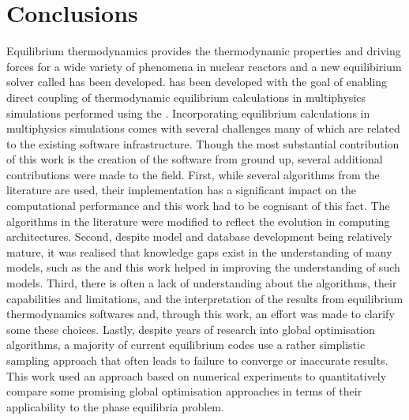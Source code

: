 \chapter{Conclusions} \label{chap:conclusions}

	Equilibrium thermodynamics provides the thermodynamic properties and driving forces for a wide variety of phenomena in nuclear reactors and a new equilibirium solver called {\GEM} has been developed. {\GEM} has been developed with the goal of enabling direct coupling of thermodynamic equilibrium calculations in multiphysics simulations performed using the . Incorporating equilibrium calculations in multiphysics simulations comes with several challenges many of which are related to the existing software infrastructure. Though the most substantial contribution of this work is the creation of the software from ground up, several additional contributions were made to the field. First, while several algorithms from the literature are used, their implementation has a significant impact on the computational performance and this work had to be cognisant of this fact. The algorithms in the literature were modified to reflect the evolution in computing architectures. Second, despite model and database development being relatively mature, it was realised that knowledge gaps exist in the understanding of many models, such as the  and this work helped in improving the understanding of such models. Third, there is often a lack of understanding about the algorithms, their capabilities and limitations, and the interpretation of the results from equilibrium thermodynamics softwares and, through this work, an effort was made to clarify some these choices. Lastly, despite years of research into global optimisation algorithms, a majority of current equilibrium codes use a rather simplistic sampling approach that often leads to failure to converge or inaccurate results. This work used an approach based on numerical experiments to quantitatively compare some promising global optimisation approaches in terms of their applicability to the phase equilibria problem. 

